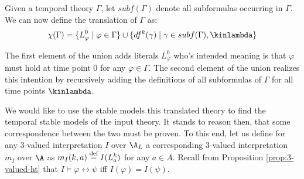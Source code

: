 Given a temporal theory $\Gamma$, let $subf(\Gamma)$ denote all
subformulas occurring in $\Gamma$.  We can now define the translation
of $\Gamma$ as:
$$
\chi(\Gamma) = \{ L_\varphi^0 \mid \varphi \in \Gamma \} 
\cup \{ df^k(\gamma) \mid \gamma \in subf(\Gamma), \kinlambda \}
$$

The first element of the union adds literals $L_\varphi^0$ who's
intended meaning is that $\varphi$ must hold at time point $0$ for any
$\varphi \in \Gamma$. The second element of the union realizes this
intention by recursively adding the definitions of all subformulas of
$\Gamma$ for all time points $\kinlambda$.

We would like to use the stable models this translated theory to find
the temporal stable models of the input theory. It stands to reason
then, that some correspondence between the two must be proven. To this
end, let us define for any 3-valued interpretation $I$ over $\A_L$ a
corresponding 3-valued interpretation $m_I$ over $\A$ as
$m_I(k,a) \stackrel{\text{def}}{=} I(L_a^k)$ for any $a \in A$. Recall from Proposition
\ref{prop:3-valued-ht} that $I \models \varphi \leftrightarrow \psi$
iff $I(\varphi) = I(\psi)$.

